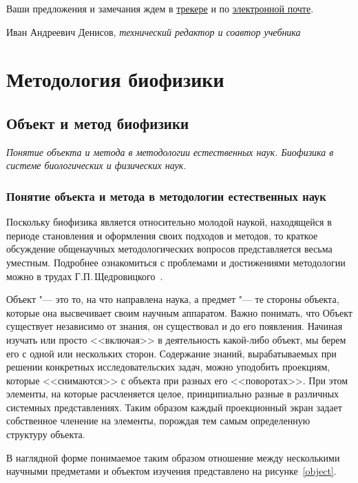 \documentclass[12pt,a4paper,oneside]{book}
\begin{document}
Ваши предложения и замечания ждем в \href{https://github.com/iadenisov/biophysics/issues}{трекере} и по \href{mailto:denisov@molpit.org?subject=Biophysics Tutorial}{электронной почте}.

\vspace{0.7cm}
Иван Андреевич Денисов, \textit{технический редактор и соавтор учебника}


\chapter{Методология биофизики}

\section{Объект и метод биофизики}
{\it Понятие объекта и метода в методологии естественных наук. Биофизика в системе биологических и физических наук.}

\subsection{Понятие объекта и метода в методологии естественных наук}

Поскольку биофизика является относительно молодой наукой, находящейся в периоде становления и оформления своих подходов и методов, то краткое обсуждение общенаучных методологических вопросов представляется весьма уместным. Подробнее ознакомиться с проблемами и достижениями методологии можно в трудах Г.П.\,Щедровицкого~\cite{Shedrovickij1995}.

Объект "--- это то, на что направлена наука, а предмет "--- те стороны объекта, которые она высвечивает своим научным аппаратом. Важно понимать, что Объект существует независимо от знания, он существовал и до его появления. Начиная изучать или просто <<включая>> в деятельность какой-либо объект, мы берем его с одной или нескольких сторон. Содержание знаний, вырабатываемых при решении конкретных исследовательских задач, можно уподобить проекциям, которые <<снимаются>> с объекта при разных его <<поворотах>>. При этом элементы, на которые расчленяется целое, принципиально разные в различных системных представлениях. Таким образом каждый проекционный экран задает собственное членение на элементы, порождая тем самым определенную структуру объекта.

В наглядной форме понимаемое таким образом отношение между несколькими научными предметами и объектом изучения представлено на рисунке~\ref{object}.
\end{document}

